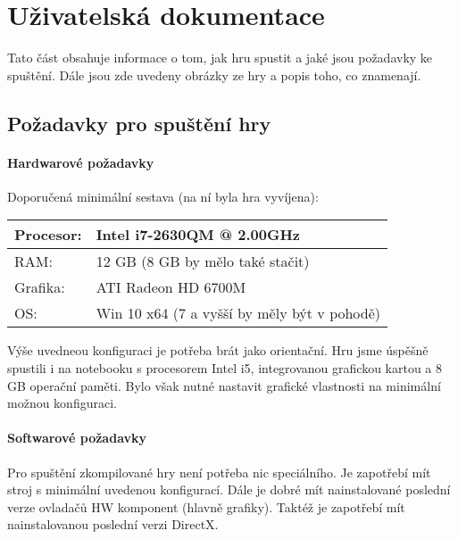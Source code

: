 
\chapter{Uživatelská dokumentace}

Tato část obsahuje informace o tom, jak hru spustit a jaké jsou požadavky ke spuštění. Dále jsou zde uvedeny obrázky ze hry a popis toho, co znamenají. 

\section{Požadavky pro spuštění hry}
\subsubsection{Hardwarové požadavky}

Doporučená minimální sestava (na ní byla hra vyvíjena): 

\begin{center}
	\begin{tabular} { | l | l |}
		\hline
		Procesor: 	&	Intel i7-2630QM @ 2.00GHz \\	\hline
		RAM:		&	12 GB	(8 GB by mělo také stačit) \\	\hline
		Grafika:	&	ATI Radeon HD 6700M \\	\hline
		OS:			&	Win 10 x64	(7 a vyšší by měly být v pohodě) \\
		\hline
	\end{tabular}
\end{center}

Výše uvedneou konfiguraci je potřeba brát jako orientační. Hru jsme úspěšně spustili i na notebooku s procesorem Intel i5, integrovanou grafickou kartou a 8 GB operační paměti. Bylo však nutné nastavit grafické vlastnosti na minimální možnou konfiguraci. 

\subsubsection{Softwarové požadavky}

Pro spuštění zkompilované hry není potřeba nic speciálního. Je zapotřebí mít stroj s minimální uvedenou konfigurací. Dále je dobré mít nainstalované poslední verze ovladačů HW komponent (hlavně grafiky).
Taktéž je zapotřebí mít nainstalovanou poslední verzi DirectX. 















